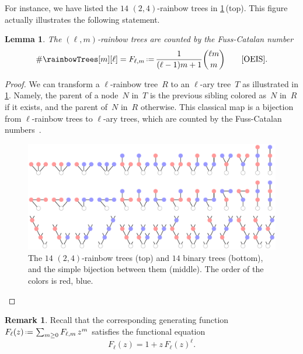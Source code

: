 \documentclass{amsart}
\newcommand{\darkblue}{\color{darkblue}} %
\newtheorem{lemma}[theorem]{Lemma}
\theoremstyle{definition}
\newtheorem{remark}[theorem]{Remark}
\newcommand{\eqdef}{\mbox{\,\raisebox{0.2ex}{\scriptsize\ensuremath{\mathrm:}}\ensuremath{=}\,}} %
\newcommand{\card}[1]{\##1} %
\newcommand{\defn}[1]{\textsl{\darkblue #1}} %
\newcommand{\OEIS}[1]{\cite[{\rm \href{http://oeis.org/#1}{\texttt{#1}}}]{OEIS}}
\begin{document}
For instance, we have listed the $14$ $(2,4)$-rainbow trees in \cref{fig:rainbowTrees}\,(top).
This figure actually illustrates the following statement.

\begin{lemma}
\label{lem:FussCatalan}
The $(\ell,m)$-rainbow trees are counted by the \defn{Fuss-Catalan number}
\[
\card{\rainbowTrees[m][\ell]} = F_{\ell,m} \eqdef \frac{1}{(\ell-1)m+1} \binom{\ell m}{m} \qquad \text{\OEIS{A062993}}.
\]
\end{lemma}

\begin{proof}
We can transform a $\ell$-rainbow tree~$R$ to an $\ell$-ary tree~$T$ as illustrated in \cref{fig:rainbowTrees}.
Namely, the parent of a node~$N$ in~$T$ is the previous sibling colored as~$N$ in~$R$ if it exists, and the parent of~$N$ in~$R$ otherwise.
This classical map is a bijection from $\ell$-rainbow trees to $\ell$-ary trees, which are counted by the Fuss-Catalan numbers~\cite{Klarner, HiltonPedersen}.
%
\begin{figure}
	\centerline{\includegraphics[scale=.7]{rainbowTrees}}
	\caption{The $14$ $(2,4)$-rainbow trees (top) and $14$ binary trees (bottom), and the simple bijection between them (middle). The order of the colors is red, blue.}
	\label{fig:rainbowTrees}
\end{figure}
\end{proof}

\begin{remark}
\label{rem:functionalEquationFussCatalan}
Recall that the corresponding generating function~$F_\ell(z) \eqdef \sum_{m \ge 0} F_{\ell,m} \, z^m$ satisfies the functional equation
\[
F_\ell(z) = 1 + z \, F_\ell(z)^\ell.
\]
\end{remark}
\end{document}
